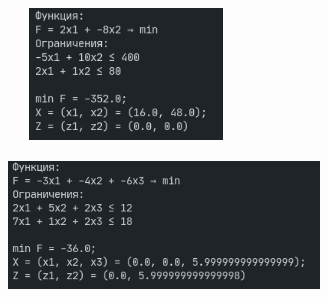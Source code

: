 \documentclass[a4paper,12pt]{article}
\begin{document}
\begin{flushleft}
\begin{figure}[H]
  \centering
  \caption{}
\end{figure}
\begin{figure}[H]
  \includegraphics[width=6.25cm,height=3.5cm]{images/output5.png}
  \centering
  \caption{}
\end{figure}
\begin{figure}[H]
  \includegraphics[width=8.25cm,height=3.5cm]{images/output6.png}
  \centering
  \caption{}
\end{figure}
\end{flushleft}
\end{document}
